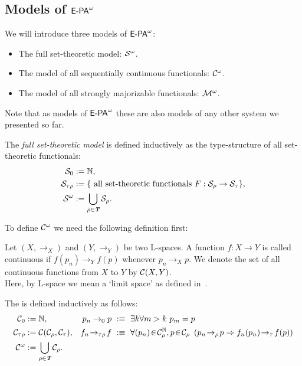 %
%
%
\subsection{Models of ${\textsf{\upshape E-PA}}^\omega$}
%
%
We will introduce three models of ${\textsf{\upshape E-PA}}^\omega$:
\begin{itemize}
\item The full set-theoretic model: $\mathcal{S} ^\omega$.
\item The model of all sequentially continuous functionals: $\mathcal{C} ^\omega$.
\item The model of all strongly majorizable functionals: $\mathcal{M} ^\omega$.
\end{itemize}
Note that as models of ${\textsf{\upshape E-PA}}^\omega$ these are also models of any other system
we presented so far.
%
\begin{dfn}The {\em full set-theoretic model} is defined inductively
as the type-structure of all set-theoretic functionals:
\setcounter{equation}{0}
\begin{align}
\mathcal{S} _0&:=\mathbb{N}\text{,}\\
\mathcal{S} _{\tau\rho}&:=\{\text{ all set-theoretic functionals } F:\mathcal{S} _\rho\rightarrow\mathcal{S} _\tau\}\text{,}\\
\mathcal{S} ^\omega&:=\bigcup_{\rho\in\emph{\protect\textbf{T}}}\mathcal{S} _\rho
\text{.}
\end{align}
\end{dfn}
%
%
%
To define $\mathcal{C} ^\omega$ we need the following definition first:
\begin{dfn}
Let $(X,\rightarrow_X)$ and $(Y,\rightarrow_Y)$ be two L-spaces. A function $f:X\rightarrow Y$
is called continuous if $f(p_n)\rightarrow_Y f(p)$ whenever $p_n\rightarrow_X p$. We denote
the set of all continuous functions from $X$ to $Y$ by $\mathcal{C} (X,Y)$.\\
Here, by L-space we mean a `limit space' as defined in~\cite{Kuratowski52}.
\end{dfn}
%
\begin{dfn}{\bf\cite{Scarpellini71}} The  is defined inductively
as follows:
\setcounter{equation}{0}
\begin{align}
\ContO_0&:=\NN\text{,} & p_n\rightarrow_0 p\ &:\equiv\ \exists k\forall m>k\ p_m=p\\
\ContO_{\tau\rho}&:=\ContO(\ContO_\rho, \ContO_\tau)\text{,} &
  f_n\!\rightarrow_{\tau\rho}\! f\ &:\equiv\ \forall (p_n)\!\in\!\ContO^\NN_\rho,p\!\in\!\ContO_\rho\ 
                  \left(p_n\!\rightarrow_\rho\! p\Rightarrow f_n(p_n)\!\rightarrow_\tau\! f(p)\right)\\
\Cont&:=\bigcup_{\rho\in\Tp}\ContO_\rho\text{.} & &
\end{align}
\end{dfn}
